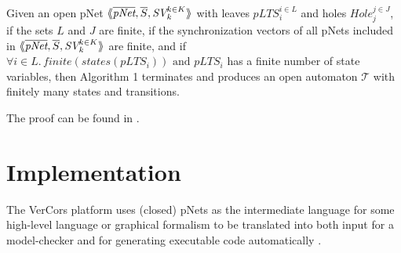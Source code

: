 \documentclass{lncs/llncs}
\begin{document}
\begin{theorem}\\
Given an open pNet $\mylangle \overline{\pNet},\overline{S}, \symb{SV}_k^{k\in K}\myrangle$ with leaves $pLTS_i^{i\in L}$ and holes $Hole_j^{j\in
  J}$, if the sets $L$ and $J$ are finite, if the synchronization vectors of all pNets 
  included in  $\mylangle \overline{\pNet},\overline{S}, \symb{SV}_k^{k\in K}\myrangle$ 
  are finite, and if
$\forall i \in L.\, finite{(states(pLTS_i))} \text{ and } pLTS_i$
has a finite number of state variables, then Algorithm 1 terminates
and produces an open automaton 
$\mathcal{T}$ with finitely many states and transitions.

The proof can be found in \cite{henrio:Forte2016}.



\end{theorem}

\section{Implementation}
\label{section:implementation}
The VerCors platform uses (closed) pNets as the intermediate language
for some high-level language or graphical formalism to be translated
into both input for a 
model-checker and for generating executable code automatically \cite{HKM-FASE16}.
\end{document}
